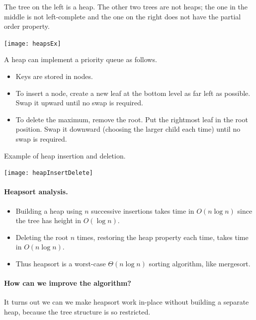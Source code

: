 \begin{Example}
The tree on the left is a heap. The other two trees are not heaps; 
the one in the middle is not left-complete and the one on the right does not have the partial order property.
\begin{center}
\texttt{[image: heapsEx]}
\end{center}
\end{Example}


A heap can implement a priority queue as follows. 
\begin{itemize}
\item Keys are stored in nodes. 
\item To insert a node, create a new leaf at the bottom level as far left as 
possible. Swap it upward until no swap is required. 
\item To delete the maximum, remove the root. Put the rightmost leaf in the root
 position. Swap it downward (choosing the larger child each time) until no swap 
is required. 
\end{itemize}

\begin{Example}
Example of heap insertion and deletion. 
\begin{center}
\texttt{[image: heapInsertDelete]}
\end{center}
\end{Example}

\paragraph{Heapsort analysis.}
\begin{itemize}
\item Building a heap using $n$ successive insertions takes time in 
$O(n\log n)$ since the tree has height in $O(\log n)$.
\item Deleting the root $n$ times, restoring the heap property each time, takes
 time in $O(n \log n)$.
\item Thus heapsort is a worst-case $\Theta(n \log n)$ sorting algorithm, like 
mergesort. 
\end{itemize}

\paragraph{How can we improve the algorithm?}
It turns out we can we make heapsort work in-place without building a separate heap, because the tree structure is so restricted.

